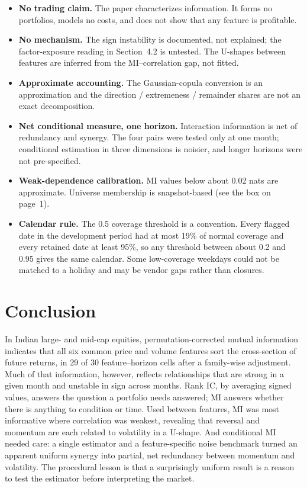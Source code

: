 \documentclass[11pt]{article}
\begin{document}
\begin{itemize}
\item \textbf{No trading claim.} The paper characterizes information. It forms no
portfolios, models no costs, and does not show that any feature is profitable.
\item \textbf{No mechanism.} The sign instability is documented, not explained; the
factor-exposure reading in Section~4.2 is untested. The U-shapes between features are
inferred from the MI--correlation gap, not fitted.
\item \textbf{Approximate accounting.} The Gaussian-copula conversion is an
approximation and the direction / extremeness / remainder shares are not an exact
decomposition.
\item \textbf{Net conditional measure, one horizon.} Interaction information is net of
redundancy and synergy. The four pairs were tested only at one month; conditional
estimation in three dimensions is noisier, and longer horizons were not pre-specified.
\item \textbf{Weak-dependence calibration.} MI values below about 0.02 nats are
approximate. Universe membership is snapshot-based (see the box on page~1).
\item \textbf{Calendar rule.} The 0.5 coverage threshold is a convention. Every
flagged date in the development period had at most 19\% of normal coverage and every
retained date at least 95\%, so any threshold between about 0.2 and 0.95 gives the same
calendar. Some low-coverage
weekdays could not be matched to a holiday and may be vendor gaps rather than closures.
\end{itemize}

\section{Conclusion}

In Indian large- and mid-cap equities, permutation-corrected mutual information
indicates that all six common price and volume features sort the cross-section of
future returns, in 29 of 30 feature--horizon cells after a family-wise adjustment. Much of that
information, however, reflects relationships that are strong in a given month and
unstable in sign across months. Rank IC, by averaging signed values, answers the
question a portfolio needs answered; MI answers whether there is anything to condition
or time. Used between features, MI was most informative where correlation was weakest,
revealing that reversal and momentum are each related to volatility in a U-shape. And
conditional MI needed care: a single estimator and a feature-specific noise benchmark
turned an apparent uniform synergy into partial, net redundancy between momentum and
volatility. The procedural lesson is that a surprisingly uniform result is a reason to
test the estimator before interpreting the market.

\aistatement
{}

\renewcommand{\bibfont}{\small}\setlength{\bibsep}{1pt plus 1pt}


\end{document}
